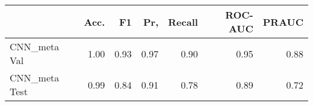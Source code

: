 \begin{tabular}{lrrrrrr}
\toprule
{} &  Acc. &    F1 &   Pr, &  Recall &  ROC-AUC &  PRAUC \\
\midrule
CNN\_meta Val  &  1.00 &  0.93 &  0.97 &    0.90 &     0.95 &   0.88 \\
CNN\_meta Test &  0.99 &  0.84 &  0.91 &    0.78 &     0.89 &   0.72 \\
\bottomrule
\end{tabular}
